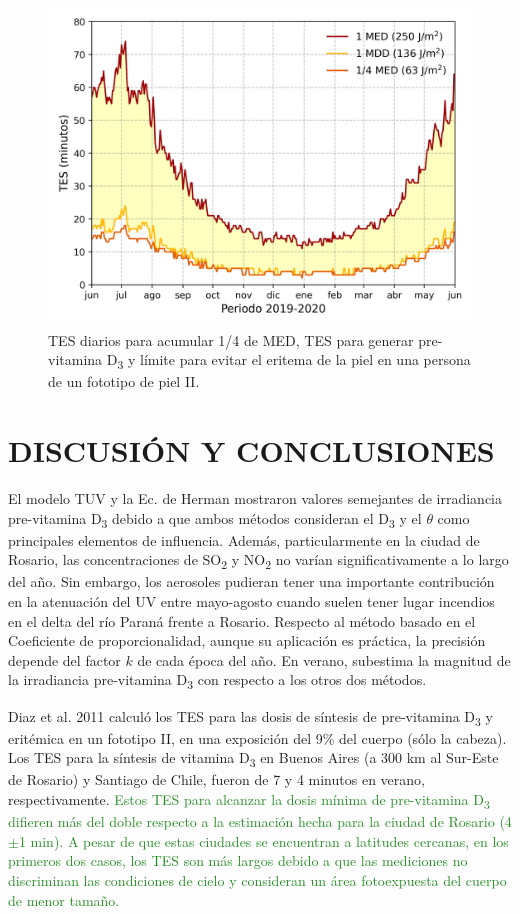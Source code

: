 \documentclass[10pt,twocolumn]{article}
\begin{document}
\begin{figure}[ht]
  \centering
  \includegraphics[scale=0.47]{dosis_vitamin.png}
  \caption{TES diarios para acumular 1/4 de MED, TES para generar pre-vitamina D\textsubscript{3} y límite para evitar el eritema de la piel en una persona de un fototipo de piel II.}
  \label{fig:TES}
\end{figure}

\section{DISCUSIÓN Y CONCLUSIONES}
El modelo TUV y la Ec. de Herman mostraron valores semejantes de irradiancia pre-vitamina D\textsubscript{3} debido a que ambos métodos consideran el D\textsubscript{3} y el $\theta$ como principales elementos de influencia. Además, particularmente en la ciudad de Rosario, las concentraciones de SO\textsubscript{2} y NO\textsubscript{2} no varían significativamente a lo largo del año. Sin embargo, los aerosoles pudieran tener una importante contribución en la atenuación del UV entre mayo-agosto cuando suelen tener lugar incendios en el delta del río Paraná frente a Rosario.\cite{Madronich1987} Respecto al método basado en el Coeficiente de proporcionalidad, aunque su aplicación es práctica, la precisión depende del factor $k$ de cada época del año. En verano, subestima la magnitud de la irradiancia pre-vitamina D\textsubscript{3} con respecto a los otros dos métodos.

Diaz et al. 2011 calculó los TES para las dosis de síntesis de pre-vitamina D\textsubscript{3} y eritémica en un fototipo II, en una exposición del 9\% del cuerpo (sólo la cabeza). Los TES para la síntesis de vitamina D\textsubscript{3} en Buenos Aires (a 300 km al Sur-Este de Rosario) y Santiago de Chile, fueron de 7 y 4 minutos en verano, respectivamente.\cite{IPINA2012966} \textcolor{ForestGreen}{Estos TES para alcanzar la dosis mínima de pre-vitamina D\textsubscript{3} difieren más del doble respecto a la estimación hecha para la ciudad de Rosario (4$\pm$1 min). A pesar de que estas ciudades se encuentran a latitudes cercanas, en los primeros dos casos, los TES son más largos debido a que las mediciones no discriminan las condiciones de cielo y consideran un área fotoexpuesta del cuerpo de menor tamaño.}
\end{document}
